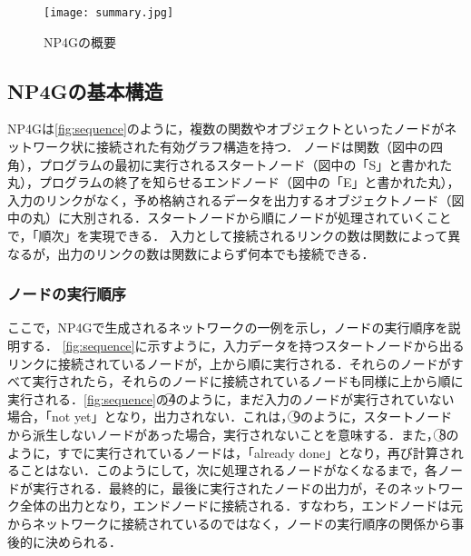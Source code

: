 \documentclass[exploratorypaper]{jsaiart} %
\begin{document}
\begin{figure}[t]
    \begin{center}
        \texttt{[image: summary.jpg]}
    \end{center}
    \capwidth=90mm %
    \caption{NP4Gの概要}
    \label{fig:summary}
\end{figure}

\subsection{NP4Gの基本構造}
\label{sec:struct}
NP4Gは\ref{fig:sequence}のように，複数の関数やオブジェクトといったノードがネットワーク状に接続された有効グラフ構造を持つ．
ノードは関数（図中の四角），プログラムの最初に実行されるスタートノード（図中の「S」と書かれた丸），プログラムの終了を知らせるエンドノード（図中の「E」と書かれた丸），入力のリンクがなく，予め格納されるデータを出力するオブジェクトノード（図中の丸）に大別される．スタートノードから順にノードが処理されていくことで，「順次」を実現できる．
入力として接続されるリンクの数は関数によって異なるが，出力のリンクの数は関数によらず何本でも接続できる．
\subsubsection{ノードの実行順序}
\label{sec:sequence}
ここで，NP4Gで生成されるネットワークの一例を示し，ノードの実行順序を説明する．
\ref{fig:sequence}に示すように，入力データを持つスタートノードから出るリンクに接続されているノードが，上から順に実行される．それらのノードがすべて実行されたら，それらのノードに接続されているノードも同様に上から順に実行される．\ref{fig:sequence}の\textcircled{\scriptsize 4}のように，まだ入力のノードが実行されていない場合，「not yet」となり，出力されない．これは，\textcircled{\scriptsize 9}のように，スタートノードから派生しないノードがあった場合，実行されないことを意味する．また，\textcircled{\scriptsize 8}のように，すでに実行されているノードは，「already done」となり，再び計算されることはない．このようにして，次に処理されるノードがなくなるまで，各ノードが実行される．最終的に，最後に実行されたノードの出力が，そのネットワーク全体の出力となり，エンドノードに接続される．すなわち，エンドノードは元からネットワークに接続されているのではなく，ノードの実行順序の関係から事後的に決められる．
\end{document}
